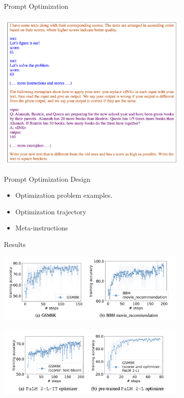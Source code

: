 \documentclass[aspectratio=1610,xcolor={dvipsnames},hyperref={colorlinks,unicode,linkcolor=violet,anchorcolor=BlueViolet,citecolor=YellowOrange,filecolor=black,urlcolor=Aquamarine}]{beamer}
\begin{document}
\begin{frame}[label={sec:org24f9bad}]{Prompt Optimization}
\begin{center}
\includegraphics[height=8cm]{./p5.png}
\end{center}
\end{frame}
\begin{frame}[label={sec:orgcf57905}]{Prompt Optimization Design}
\begin{itemize}
\item Optimization problem examples.
\item Optimization trajectory
\item Meta-instructions
\end{itemize}
\end{frame}
\begin{frame}[label={sec:orgd1d50a3}]{Results}
\begin{center}
\includegraphics[height=3.5cm]{./p6.png}
\end{center}

\begin{center}
\includegraphics[height=3.5cm]{./p7.png}
\end{center}
\end{frame}
\end{document}
